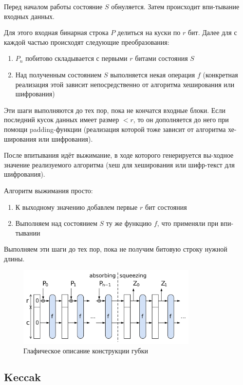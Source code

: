 \documentclass[a4paper]{article}
\begin{document}
  Перед началом работы состояние $S$ обнуляется. Затем происходит впи-тывание
  входных данных.

  Для этого входная бинарная строка $P$ делиться на куски по $r$ бит. Далее для
  с каждой частью происходят следующие преобразования:
  \begin{enumerate}
    \item $P_n$ побитово складывается с первыми $r$ битами состояния $S$
    \item Над полученным состоянием $S$ выполняется некая операция $f$
    (конкретная реализация этой зависит непосредственно от алгоритма хеширования
    или шифрования)
  \end{enumerate}

  Эти шаги выполняются до тех пор, пока не кончатся входные блоки. Если последний
  кусок данных имеет размер $< r$, то он дополняется до него при помощи padding-функции
  (реализация которой тоже зависит от алгоритма хе-ширования или шифрования).

  После впитывания идёт выжимание, в ходе которого генерируется вы-ходное значение
  реализуемого алгоритма (хеш для хеширования или шифр-текст для шифрования).

  Алгоритм выжимания просто:
  \begin{enumerate}
    \item К выходному значению добавлем первые $r$ бит состояния
    \item Выполняем над состоянием $S$ ту же функцию $f$, что применяли при впи-тывании
  \end{enumerate}

  Выполняем эти шаги до тех пор, пока не получим битовую строку нужной длины.

  \begin{figure}[H]
    \centering
    \includegraphics[width=0.8\textwidth]{sponge.png}
    \caption{Глафическое описание конструкции губки}
  \end{figure}

  \subsection{Keccak}
\end{document}
